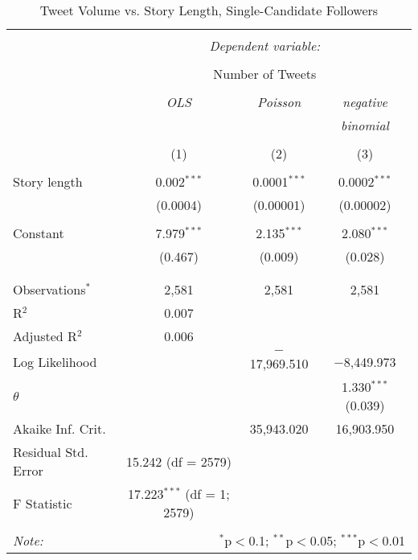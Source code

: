 \begin{table}[!htbp] \centering 
  \caption{Tweet Volume vs. Story Length, Single-Candidate Followers} 
  \label{} 
    \begin{tabular}{@{\extracolsep{5pt}}lccc} 
    \\[-1.8ex]\hline 
    \hline \\[-1.8ex] 
     & \multicolumn{3}{c}{\textit{Dependent variable:}} \\ 
    \cline{2-4} 
    \\[-1.8ex] & \multicolumn{3}{c}{Number of Tweets} \\ 
    \\[-1.8ex] & \textit{OLS} & \textit{Poisson} & \textit{negative} \\ 
     & \textit{} & \textit{} & \textit{binomial} \\ 
    \\[-1.8ex] & (1) & (2) & (3)\\ 
    \hline \\[-1.8ex] 
     Story length & 0.002$^{***}$ & 0.0001$^{***}$ & 0.0002$^{***}$ \\ 
      & (0.0004) & (0.00001) & (0.00002) \\ 
      & & & \\ 
     Constant & 7.979$^{***}$ & 2.135$^{***}$ & 2.080$^{***}$ \\ 
      & (0.467) & (0.009) & (0.028) \\ 
      & & & \\ 
    \hline \\[-1.8ex] 
    Observations$^{*}$ & 2,581 & 2,581 & 2,581 \\ 
    R$^{2}$ & 0.007 &  &  \\ 
    Adjusted R$^{2}$ & 0.006 &  &  \\ 
    Log Likelihood &  & $-$17,969.510 & $-$8,449.973 \\ 
    $\theta$ &  &  & 1.330$^{***}$  (0.039) \\ 
    Akaike Inf. Crit. &  & 35,943.020 & 16,903.950 \\ 
    Residual Std. Error & 15.242 (df = 2579) &  &  \\ 
    F Statistic & 17.223$^{***}$ (df = 1; 2579) &  &  \\ 
    \hline 
    \hline \\[-1.8ex] 
    \textit{Note:}  & \multicolumn{3}{r}{$^{*}$p$<$0.1; $^{**}$p$<$0.05; $^{***}$p$<$0.01} \\ 
    \end{tabular} 
\end{table}
